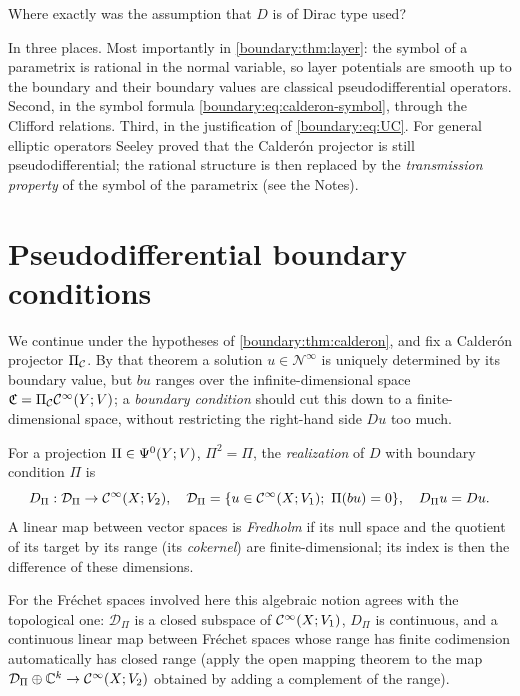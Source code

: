 \begin{question}
Where exactly was the assumption that $D$ is of Dirac type used?
\end{question}
\begin{answer}
In three places. Most importantly in \cref{boundary:thm:layer}: the symbol of a
parametrix is rational in the normal variable, so layer potentials are smooth up to
the boundary and their boundary values are classical pseudodifferential operators.
Second, in the symbol formula \eqref{boundary:eq:calderon-symbol}, through the
Clifford relations. Third, in the justification of \eqref{boundary:eq:UC}. For
general elliptic operators Seeley proved that the Calder\'on projector is still
pseudodifferential; the rational structure is then replaced by the
\emph{transmission property} of the symbol of the parametrix (see the Notes).
\end{answer}

\section{Pseudodifferential boundary conditions}\label{boundary:sec:bc}

We continue under the hypotheses of \cref{boundary:thm:calderon}, and fix a Calder\'on
projector $\Pi_{\mathcal{C}}$. By that theorem a solution $u\in\mathcal{N}^\infty$ is uniquely
determined by its boundary value, but $bu$ ranges over the infinite-dimensional space
$\mathfrak{C}=\Pi_{\mathcal{C}}\mathcal{C}^\infty(Y;V)$; a \emph{boundary condition} should cut this down to a
finite-dimensional space, without restricting the right-hand side $Du$ too much.

\begin{definition}\label{boundary:def:bc}
For a projection $\Pi\in\Psi^{0}(Y;V)$, $\Pi^2=\Pi$, the \emph{realization} of $D$ with
boundary condition $\Pi$ is
\begin{equation*}
D_\Pi:\mathcal{D}_\Pi\to\mathcal{C}^\infty(X;V_2),\quad \mathcal{D}_\Pi=\{u\in\mathcal{C}^\infty(X;V_1);\
\Pi(bu)=0\},\quad D_\Pi u=Du.
\end{equation*}
A linear map between vector spaces is \emph{Fredholm} if its null space and the
quotient of its target by its range (its \emph{cokernel}) are finite-dimensional; its
index is then the difference of these dimensions.
\end{definition}

For the Fr\'echet spaces involved here this algebraic notion agrees with the
topological one: $\mathcal D_\Pi$ is a closed subspace of $\mathcal{C}^\infty(X;V_1)$, $D_\Pi$ is
continuous, and a continuous linear map between Fr\'echet spaces whose range has finite
codimension automatically has closed range (apply the open mapping theorem to the map
$\mathcal{D}_\Pi\oplus\mathbb{C}^k\to\mathcal{C}^\infty(X;V_2)$ obtained by adding a complement of the range).

